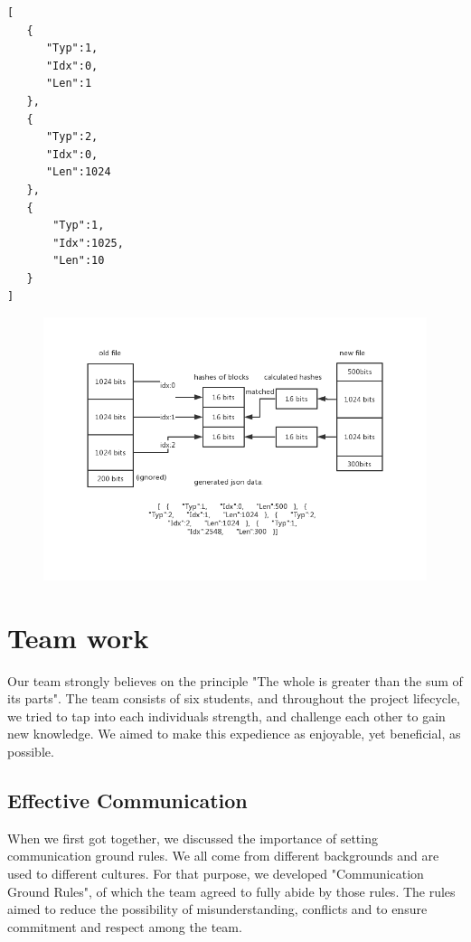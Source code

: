 \documentclass{article}
\begin{document}
\begin{lstlisting}
[
   {
      "Typ":1,
      "Idx":0,
      "Len":1
   },
   {
      "Typ":2,
      "Idx":0,
      "Len":1024
   },
   {
       "Typ":1,
       "Idx":1025,
       "Len":10
   }
]

\end{lstlisting}

 \begin{figure}[H]
     \centering
     \includegraphics[width=1.1\textwidth]{reassembling-stage}
     \caption{}
     \label{fig:reassembling-stage}
 \end{figure}


\section{Team work}
Our team strongly believes on the principle "The whole is greater than the sum of its parts". The team consists of six students, and throughout the project lifecycle, we tried to tap into each individuals strength, and challenge each other to gain new knowledge. We aimed to make this expedience as enjoyable, yet beneficial, as possible.

\subsection{Effective Communication}
When we first got together, we discussed the importance of setting communication ground rules. We all come from different backgrounds and are used to different cultures. For that purpose, we developed "Communication Ground Rules", of which the team agreed to fully abide by those rules. The rules aimed to reduce the possibility of misunderstanding, conflicts and to ensure commitment and respect among the team.
\end{document}
